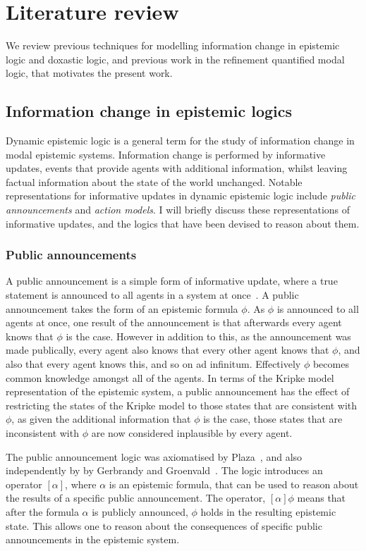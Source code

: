 \chapter{Literature review}

We review previous techniques for modelling information change in epistemic
logic and doxastic logic, and previous work in the refinement quantified modal
logic, that motivates the present work.

\section{Information change in epistemic logics}

Dynamic epistemic logic is a general term for the study of information change in
modal epistemic systems. Information change is performed by informative updates,
events that provide agents with additional information, whilst leaving factual
information about the state of the world unchanged. Notable representations for
informative updates in dynamic epistemic logic include {\em public
announcements} and {\em action models}. I will briefly discuss these
representations of informative updates, and the logics that have been devised to
reason about them.

\subsection{Public announcements}

A public announcement is a simple form of informative update, where a true
statement is announced to all agents in a system at
once~\cite{vanditmarsch2007dynamic}.  A public announcement takes the form of an
epistemic formula $\phi$. As $\phi$ is announced to all agents at once, one
result of the announcement is that afterwards every agent knows that $\phi$ is
the case. However in addition to this, as the announcement was made publically,
every agent also knows that every other agent knows that $\phi$, and also that
every agent knows this, and so on ad infinitum.  Effectively $\phi$ becomes
common knowledge amongst all of the agents. In terms of the Kripke model
representation of the epistemic system, a public announcement has the effect of
restricting the states of the Kripke model to those states that are consistent
with $\phi$, as given the additional information that $\phi$ is the case, those
states that are inconsistent with $\phi$ are now considered inplausible by every
agent.

The public announcement logic was axiomatised by Plaza~\cite{plaza2007logics},
and also independently by by Gerbrandy and
Groenvald~\cite{gerbrandy1997reasoning}.  The logic introduces an operator
$[\alpha]$, where $\alpha$ is an epistemic formula, that can be used to reason
about the results of a specific public announcement. The operator, $[\alpha]
\phi$ means that after the formula $\alpha$ is publicly announced, $\phi$ holds
in the resulting epistemic state. This allows one to reason about the
consequences of specific public announcements in the epistemic system.

